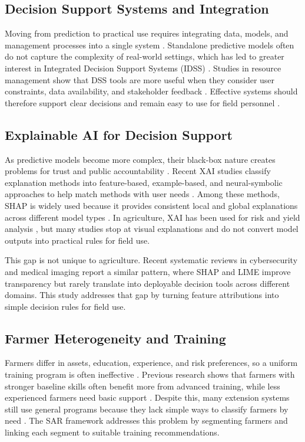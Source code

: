 \documentclass[fleqn,10pt,lineno]{wlpeerj}
\begin{document}
\subsection{Decision Support Systems and Integration}
Moving from prediction to practical use requires integrating data, models, and management processes into a single system \citep{liu2009}. Standalone predictive models often do not capture the complexity of real-world settings, which has led to greater interest in Integrated Decision Support Systems (IDSS) \citep{liu2009}. Studies in resource management show that DSS tools are more useful when they consider user constraints, data availability, and stakeholder feedback \citep{volk2010}. Effective systems should therefore support clear decisions and remain easy to use for field personnel \citep{volk2010}.

\subsection{Explainable AI for Decision Support}
As predictive models become more complex, their black-box nature creates problems for trust and public accountability \citep{hassija2024}. Recent XAI studies classify explanation methods into feature-based, example-based, and neural-symbolic approaches to help match methods with user needs \citep{speith2022, dwivedi2023}. Among these methods, SHAP is widely used because it provides consistent local and global explanations across different model types \citep{lundberg2017, lundberg2020, guidotti2019}. In agriculture, XAI has been used for risk and yield analysis \citep{ghosal2018, ryo2022}, but many studies stop at visual explanations and do not convert model outputs into practical rules for field use.

This gap is not unique to agriculture. Recent systematic reviews 
in cybersecurity \citep{yu2026} and medical imaging \citep{gokula2026} 
report a similar pattern, where SHAP and LIME improve transparency 
but rarely translate into deployable decision tools across 
different domains. This study addresses that gap by turning 
feature attributions into simple decision rules for field use.

\subsection{Farmer Heterogeneity and Training}
Farmers differ in assets, education, experience, and risk preferences, so a uniform training program is often ineffective \citep{feder1985, anderson2004}. Previous research shows that farmers with stronger baseline skills often benefit more from advanced training, while less experienced farmers need basic support \citep{davis2012}. Despite this, many extension systems still use general programs because they lack simple ways to classify farmers by need \citep{anderson2004}. The SAR framework addresses this problem by segmenting farmers and linking each segment to suitable training recommendations.
\end{document}
